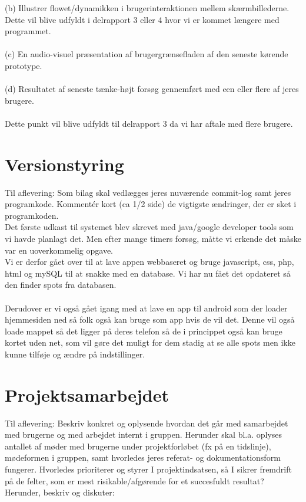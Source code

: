 \documentclass[12pt]{article}
\begin{document}
(b) Illustrer flowet/dynamikken i brugerinteraktionen mellem skærmbillederne.\\
Dette vil blive udfyldt i delrapport 3 eller 4 hvor vi er kommet længere med programmet.\\\\
(c) En audio-visuel præsentation af brugergrænsefladen af den seneste kørende prototype.\\\\
(d) Resultatet af seneste tænke-højt forsøg gennemført med een eller flere af jeres brugere.\\\\
Dette punkt vil blive udfyldt til delrapport 3 da vi har aftale med flere brugere.\\

\pagebreak
\section{Versionstyring}
Til aflevering: Som bilag skal vedlægges jeres nuværende commit-log samt jeres
programkode. Kommentér kort (ca 1/2 side) de vigtigste ændringer, der er sket i programkoden.\\

Det første udkast til systemet blev skrevet med java/google developer tools som vi havde planlagt det. Men efter mange timers forsøg, måtte vi erkende det måske var en uoverkommelig opgave.\\
Vi er derfor gået over til at lave appen webbaseret og bruge javascript, css, php, html og mySQL til at snakke med en database. Vi har nu fået det opdateret så den finder spots fra databasen. \\
\\
Derudover er vi også gået igang med at lave en app til android som der loader hjemmesiden ned så folk også kan bruge som app hvis de vil det. Denne vil også loade mappet så det ligger på deres telefon så de i princippet også kan bruge kortet uden net, som vil gøre det muligt for dem stadig at se alle spots men ikke kunne tilføje og ændre på indstillinger.




\pagebreak
\section{Projektsamarbejdet}
Til aflevering: Beskriv konkret og oplysende hvordan det går med samarbejdet med brugerne
og med arbejdet internt i gruppen. Herunder skal bl.a. oplyses antallet af møder med brugerne under
projektforløbet (fx på en tidslinje), mødeformen i gruppen, samt hvorledes jeres referat- og
dokumentationsform fungerer. Hvorledes prioriterer og styrer I projektindsatsen, så I sikrer
fremdrift på de felter, som er mest risikable/afgørende for et succesfuldt resultat? Herunder, beskriv
og diskuter:\\
\end{document}
